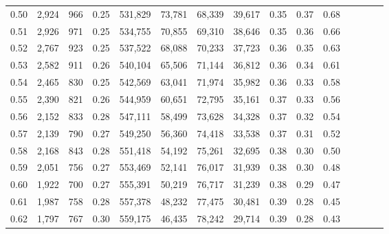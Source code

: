 \begin{tabular}{rrrcrrrrrrrrrrr}
0.50 &   2,924 &     966 &                                       0.25 &  531,829 &   73,781 &   68,339 &   39,617 &  0.35 &  0.37 &                         0.68 \\
0.51 &   2,926 &     971 &                                       0.25 &  534,755 &   70,855 &   69,310 &   38,646 &  0.35 &  0.36 &                         0.66 \\
0.52 &   2,767 &     923 &                                       0.25 &  537,522 &   68,088 &   70,233 &   37,723 &  0.36 &  0.35 &                         0.63 \\
0.53 &   2,582 &     911 &                                       0.26 &  540,104 &   65,506 &   71,144 &   36,812 &  0.36 &  0.34 &                         0.61 \\
0.54 &   2,465 &     830 &                                       0.25 &  542,569 &   63,041 &   71,974 &   35,982 &  0.36 &  0.33 &                         0.58 \\
0.55 &   2,390 &     821 &                                       0.26 &  544,959 &   60,651 &   72,795 &   35,161 &  0.37 &  0.33 &                         0.56 \\
0.56 &   2,152 &     833 &                                       0.28 &  547,111 &   58,499 &   73,628 &   34,328 &  0.37 &  0.32 &                         0.54 \\
0.57 &   2,139 &     790 &                                       0.27 &  549,250 &   56,360 &   74,418 &   33,538 &  0.37 &  0.31 &                         0.52 \\
0.58 &   2,168 &     843 &                                       0.28 &  551,418 &   54,192 &   75,261 &   32,695 &  0.38 &  0.30 &                         0.50 \\
0.59 &   2,051 &     756 &                                       0.27 &  553,469 &   52,141 &   76,017 &   31,939 &  0.38 &  0.30 &                         0.48 \\
0.60 &   1,922 &     700 &                                       0.27 &  555,391 &   50,219 &   76,717 &   31,239 &  0.38 &  0.29 &                         0.47 \\
0.61 &   1,987 &     758 &                                       0.28 &  557,378 &   48,232 &   77,475 &   30,481 &  0.39 &  0.28 &                         0.45 \\
0.62 &   1,797 &     767 &                                       0.30 &  559,175 &   46,435 &   78,242 &   29,714 &  0.39 &  0.28 &                         0.43 \\

\end{tabular}
